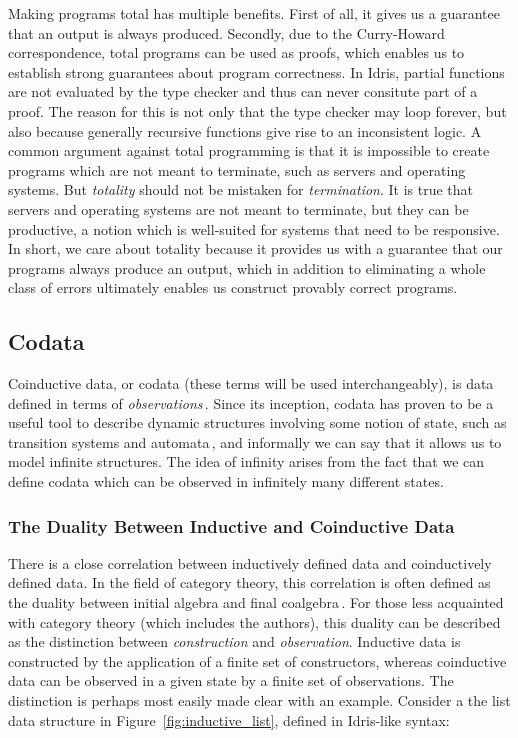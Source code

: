 Making programs total has multiple benefits. First of all, it gives us a guarantee that an output is always produced. Secondly, due to the Curry-Howard correspondence, total programs can be used as proofs, which enables us to establish strong guarantees about program correctness. In Idris, partial functions are not evaluated by the type checker and thus can never consitute part of a proof. The reason for this is not only that the type checker may loop forever, but also because generally recursive functions give rise to an inconsistent logic. A common argument against total programming is that it is impossible to create programs which are not meant to terminate, such as servers and operating systems. But \emph{totality} should not be mistaken for \emph{termination}. It is true that servers and operating systems are not meant to terminate, but they can be productive, a notion which is well-suited for systems that need to be responsive. In short, we care about totality because it provides us with a guarantee that our programs always produce an output, which in addition to eliminating a whole class of errors ultimately enables us construct provably correct programs.


\subsection{Codata}
\label{sec:codata}
Coinductive data, or codata (these terms will be used interchangeably), is data defined in terms of \emph{observations}\,\citep{Jacobs97atutorial}. Since its inception, codata has proven to be a useful tool to describe dynamic structures involving some notion of state, such as transition systems and automata\,\citep{Jacobs97atutorial}, and informally we can say that it allows us to model infinite structures. The idea of infinity arises from the fact that we can define codata which can be observed in infinitely many different states.

\subsubsection{The Duality Between Inductive and Coinductive Data} There is a close correlation between inductively defined data and coinductively defined data. In the field of category theory, this correlation is often defined as the duality between initial algebra and final coalgebra\,\citep{Jacobs97atutorial}. For those less acquainted with category theory (which includes the authors), this duality can be described as the distinction between \emph{construction} and \emph{observation}. Inductive data is constructed by the application of a finite set of constructors, whereas coinductive data can be observed in a given state by a finite set of observations. The distinction is perhaps most easily made clear with an example. Consider a the list data structure in Figure~\ref{fig:inductive_list}, defined in Idris-like syntax:

